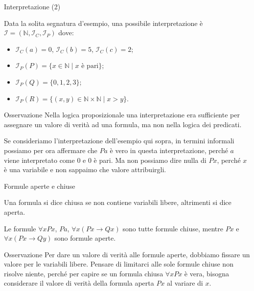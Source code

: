 \documentclass[aspectratio=169,10pt,dvipsnames,xcolor=table,handout]{beamer}
\newcommand{\mcI}{\mathcal{I}}
\newcommand{\mc}{\mathcal}
\begin{document}
\begin{frame}{Interpretazione (2)}
    \begin{example}
        Data la solita segnatura d'esempio, una possibile interpretazione è $\mcI =(\mathbb N, \mathcal I_C, \mathcal I_P)$ dove:
        \begin{itemize}
            \item $\mc I_C(a) = 0$, $\mc I_C(b) = 5$, $\mc I_C(c) = 2$;
            \item $\mc I_P(P) = \{ x \in \mathbb N \mid \text{$x$ è pari} \}$;
            \item $\mc I_P(Q) = \{ 0, 1, 2, 3 \}$;
            \item $\mc I_P(R) = \{ (x,y) \in \mathbb N \times \mathbb N \mid x > y \}$.
        \end{itemize}
    \end{example}

    \begin{block}{Osservazione}
        Nella logica proposizionale una interpretazione era sufficiente per assegnare un valore di verità ad una formula, ma non nella logica dei predicati.

        \medskip
        Se consideriamo l'interpretazione dell'esempio qui sopra, in termini informali possiamo per ora affermare che $Pa$ è vero in questa interpretazione, perché $a$ viene interpretato come $0$ e $0$ è pari. Ma non possiamo dire nulla di $Px$, perché $x$ è una variabile e non sappaimo che valore attribuirgli.
    \end{block}
\end{frame}

\begin{frame}{Formule aperte e chiuse}

    \begin{definition}
        Una formula si dice \alert{chiusa} se non contiene variabili libere, altrimenti si dice \alert{aperta}.
    \end{definition}

    \begin{example}
        Le formule $\forall x Px$, $Pa$, $\forall x (Px \to Qx)$ sono tutte formule chiuse, mentre $Px$ e $\forall x (Px \to Qy)$ sono formule aperte.
    \end{example}

    \begin{block}{Osservazione}
        Per dare un valore di verità alle formule aperte, dobbiamo fissare un valore per le variabili libere. Pensare di limitarci alle sole formule chiuse non risolve niente, perché per capire se un formula chiusa $\forall x Px$ è vera, bisogna considerare il valore di verità della formula aperta $Px$ al variare di $x$.
    \end{block}
\end{frame}
\end{document}
